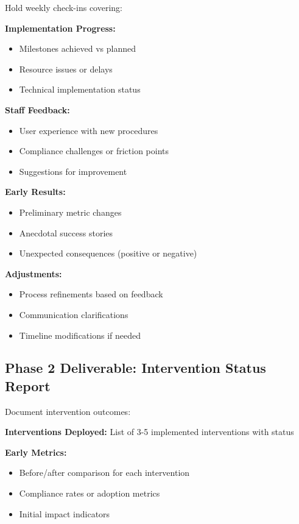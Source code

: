 \documentclass[11pt,a4paper]{article}
\begin{document}
Hold weekly check-ins covering:

\textbf{Implementation Progress:}
\begin{itemize}
\item Milestones achieved vs planned
\item Resource issues or delays
\item Technical implementation status
\end{itemize}

\textbf{Staff Feedback:}
\begin{itemize}
\item User experience with new procedures
\item Compliance challenges or friction points
\item Suggestions for improvement
\end{itemize}

\textbf{Early Results:}
\begin{itemize}
\item Preliminary metric changes
\item Anecdotal success stories
\item Unexpected consequences (positive or negative)
\end{itemize}

\textbf{Adjustments:}
\begin{itemize}
\item Process refinements based on feedback
\item Communication clarifications
\item Timeline modifications if needed
\end{itemize}

\subsection{Phase 2 Deliverable: Intervention Status Report}

Document intervention outcomes:

\textbf{Interventions Deployed:} List of 3-5 implemented interventions with status

\textbf{Early Metrics:}
\begin{itemize}
\item Before/after comparison for each intervention
\item Compliance rates or adoption metrics
\item Initial impact indicators
\end{itemize}
\end{document}
